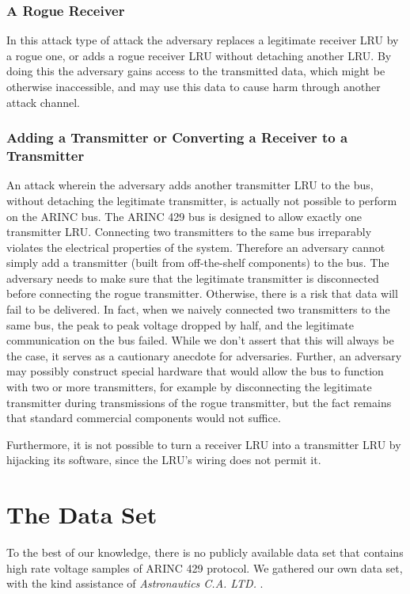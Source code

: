 \documentclass[compsoc,conference,a4paper,10pt,times]{IEEEtran}
\newcommand{\level}[1]{\section{#1}}
\newcommand{\subsublevel}[1]{\subsubsection{#1}}
\newcommand{\level}[1]{\chapter{#1}}
\newcommand{\subsublevel}[1]{\subsection{#1}}
\begin{document}

\subsublevel{A Rogue Receiver}
  In this attack type of attack the adversary replaces a legitimate receiver LRU by a rogue one, or adds a rogue receiver LRU without detaching another LRU. By doing this the adversary gains access to the transmitted data, which might be otherwise inaccessible, and may use this data to cause harm through another attack channel.

\subsublevel{Adding a Transmitter or Converting a Receiver to a Transmitter}
  An attack wherein the adversary adds another transmitter LRU to the bus, without detaching the legitimate transmitter, is actually not possible to perform on the ARINC bus. The ARINC 429 bus is designed to allow exactly one transmitter LRU. Connecting two transmitters to the same bus irreparably violates the electrical properties of the system. Therefore an adversary cannot simply add a transmitter (built from off-the-shelf components) to the bus. 
  The adversary needs to make sure that the legitimate transmitter is disconnected before connecting the rogue transmitter. Otherwise, there is a risk that data will fail to be delivered. In fact, when we naively connected two transmitters to the same bus, the peak to peak voltage dropped by half, and the legitimate communication on the bus failed. While we don't assert that this will always be the case, it serves as a cautionary anecdote for adversaries. Further, an adversary may possibly construct special hardware that would allow the bus to function with two or more transmitters, for example by disconnecting the legitimate transmitter during transmissions of the rogue transmitter, but the fact remains that standard commercial components would not suffice.

  Furthermore, it is not possible to turn a receiver LRU into a transmitter LRU by hijacking its software, since the LRU's wiring does not permit it. 
 
\level{The Data Set} \label{TheDataSet}
  To the best of our knowledge, there is no publicly available data set that contains high rate voltage samples of ARINC 429 protocol. We gathered our own data set, with the kind assistance of \textit{Astronautics C.A. LTD.} \cite{astronautics2019home}.
  
\end{document}
